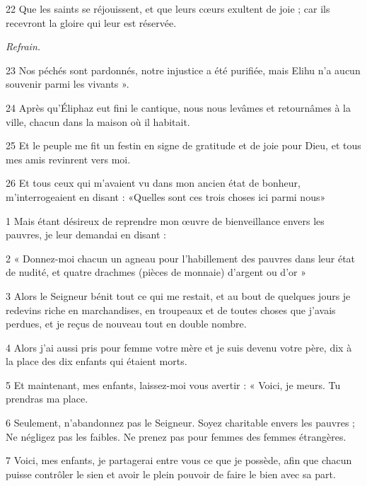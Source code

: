 \par 22 Que les saints se réjouissent, et que leurs cœurs exultent de joie ; car ils recevront la gloire qui leur est réservée.

\par \textit{Refrain.}

\par 23 Nos péchés sont pardonnés, notre injustice a été purifiée, mais Elihu n'a aucun souvenir parmi les vivants ».

\par 24 Après qu'Éliphaz eut fini le cantique, nous nous levâmes et retournâmes à la ville, chacun dans la maison où il habitait.

\par 25 Et le peuple me fit un festin en signe de gratitude et de joie pour Dieu, et tous mes amis revinrent vers moi.

\par 26 Et tous ceux qui m'avaient vu dans mon ancien état de bonheur, m'interrogeaient en disant : «Quelles sont ces trois choses ici parmi nous»


\par 1 Mais étant désireux de reprendre mon œuvre de bienveillance envers les pauvres, je leur demandai en disant :

\par 2 « Donnez-moi chacun un agneau pour l'habillement des pauvres dans leur état de nudité, et quatre drachmes (pièces de monnaie) d'argent ou d'or »

\par 3 Alors le Seigneur bénit tout ce qui me restait, et au bout de quelques jours je redevins riche en marchandises, en troupeaux et de toutes choses que j'avais perdues, et je reçus de nouveau tout en double nombre.

\par 4 Alors j'ai aussi pris pour femme votre mère et je suis devenu votre père, dix à la place des dix enfants qui étaient morts.

\par 5 Et maintenant, mes enfants, laissez-moi vous avertir : « Voici, je meurs. Tu prendras ma place.

\par 6 Seulement, n'abandonnez pas le Seigneur. Soyez charitable envers les pauvres ; Ne négligez pas les faibles. Ne prenez pas pour femmes des femmes étrangères.

\par 7 Voici, mes enfants, je partagerai entre vous ce que je possède, afin que chacun puisse contrôler le sien et avoir le plein pouvoir de faire le bien avec sa part.

